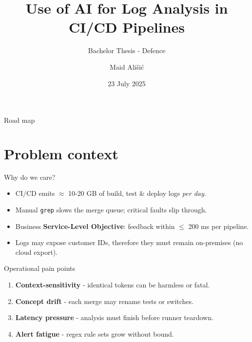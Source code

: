 \documentclass[15pt,aspectratio=169]{beamer}
\title{Use of AI for Log Analysis in CI/CD Pipelines}
\subtitle{Bachelor Thesis - Defence}
\author{Maid Ališi\'c}
\institute{FH Oberösterreich · Campus Hagenberg}
\date{23 July 2025}
\begin{document}

\maketitle

\begin{frame}{Road map}
  \tableofcontents[hideallsubsections]
\end{frame}

\section{Problem context}

\begin{frame}{Why do we care?}
\begin{itemize}[<+->]
  \item CI/CD emits \alert{$\approx$ 10-20 GB} of build, test \& deploy logs \textit{per day}. 
  \item Manual \texttt{grep} slows the merge queue; critical faults slip through.
  \item Business \textbf{Service-Level Objective}: feedback within \alert{\(\le\) 200 ms} per pipeline.
  \item Logs may expose customer IDs, therefore they must remain on-premises (no cloud export).
\end{itemize}
\end{frame}

\begin{frame}{Operational pain points}
\begin{enumerate}[<+->]
  \item \textbf{Context-sensitivity} - identical tokens can be harmless or fatal.
  \item \textbf{Concept drift} - each merge may rename tests or switches.
  \item \textbf{Latency pressure} - analysis must finish before runner teardown.
  \item \textbf{Alert fatigue} - regex rule sets grow without bound.
\end{enumerate}
\end{frame}
\end{document}
